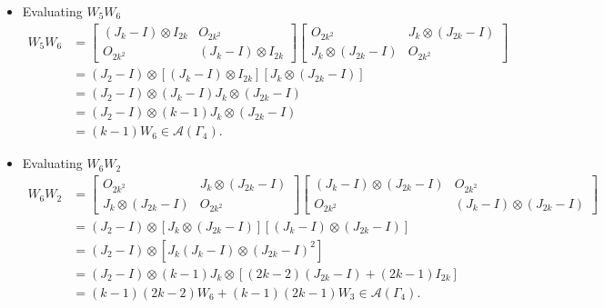 \begin{itemize}
    \item Evaluating \( W_5 W_6 \)
    \begin{align*}
        W_5 W_6
        &=\begin{bmatrix}
            (J_k-I)\otimes I_{2k} & O_{2k^2} \\
            O_{2k^2} & (J_k-I)\otimes I_{2k}
        \end{bmatrix}\begin{bmatrix}
            O_{2k^2} & J_k \otimes (J_{2k}-I) \\
            J_k \otimes (J_{2k}-I) & O_{2k^2}
        \end{bmatrix}\\
        &= (J_2-I)\otimes[(J_k-I)\otimes I_{2k}][J_k \otimes (J_{2k}-I)]\\
        &= (J_2-I)\otimes (J_k-I)J_k\otimes (J_{2k}-I)\\
        &= (J_2-I)\otimes (k-1)J_k\otimes (J_{2k}-I)\\
        &= (k-1)W_6\in\mathcal{A}(\Gamma_4).
    \end{align*}

    \item Evaluating \( W_6 W_2 \)
    \begin{align*}
        W_6W_2
        &=\begin{bmatrix}
            O_{2k^2} & J_k \otimes (J_{2k}-I) \\
            J_k \otimes (J_{2k}-I) & O_{2k^2}
        \end{bmatrix}\begin{bmatrix}
            (J_k -I) \otimes (J_{2k} -I) & O_{2k^2}\\
            O_{2k^2} & (J_k -I) \otimes (J_{2k} -I)
        \end{bmatrix}\\
        &= (J_2-I)\otimes [J_k \otimes (J_{2k}-I)][(J_k -I) \otimes (J_{2k} -I)]\\
        &= (J_2-I)\otimes [J_k(J_k-I) \otimes (J_{2k}-I)^2]\\
        &= (J_2-I)\otimes (k-1)J_k\otimes [(2k-2)(J_{2k}-I) + (2k-1)I_{2k}]\\
        &= (k-1)(2k-2)W_6 + (k-1)(2k-1)W_3\in\mathcal{A}(\Gamma_4).
    \end{align*}
    

\end{itemize}
